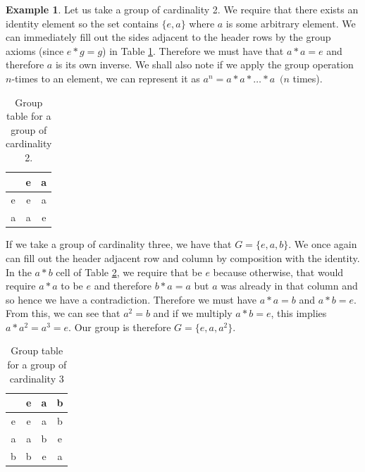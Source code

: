 \documentclass{article}
\theoremstyle{definition}
\newtheorem{example}[theorem]{Example}
\begin{document}
\begin{example}
    Let us take a group of cardinality 2. We require that there exists an identity element so the set contains $\{e,a\}$ where $a$ is some arbitrary element. We can immediately fill out the sides adjacent to the header rows by the group axioms (since $e*g=g$) in Table \ref{tab:groupCard2}. Therefore we must have that $a*a=e$ and therefore $a$ is its own inverse. We shall also note if we apply the group operation $n$-times to an element, we can represent it as $a^n=a*a*\ldots*a \,\,\,(n$ times).
    \begin{table}[htbp]
        \centering
        \begin{tabular}{c|c|c}
             &  e&a\\ \hline
             e& e&a\\ \hline
             a&a&e\\
        \end{tabular}
        \caption{Group table for a group of cardinality 2.}
        \label{tab:groupCard2}
    \end{table}
    If we take a group of cardinality three, we have that $G=\{e,a,b\}$. We once again can fill out the header adjacent row and column by composition with the identity. In the $a*b$ cell of Table \ref{tab:groupCard3}, we require that be $e$ because otherwise, that would require $a*a$ to be $e$ and therefore $b*a=a$ but $a$ was already in that column and so hence we have a contradiction. Therefore we must have $a*a=b$ and $a*b=e$. From this, we can see that $a^2=b$ and if we multiply $a*b=e$, this implies $a*a^2=a^3=e$. Our group is therefore $G=\{e,a,a^2\}$.
    \begin{table}[htbp]
        \centering
        \begin{tabular}{c|c|c|c}
             &  e&a&b\\ \hline
             e&e&a&b\\ \hline
             a&a&b&e \\ \hline
             b&b&e&a \\ 
        \end{tabular}
        \caption{Group table for a group of cardinality 3}
        \label{tab:groupCard3}
    \end{table}
\end{example}
\end{document}
